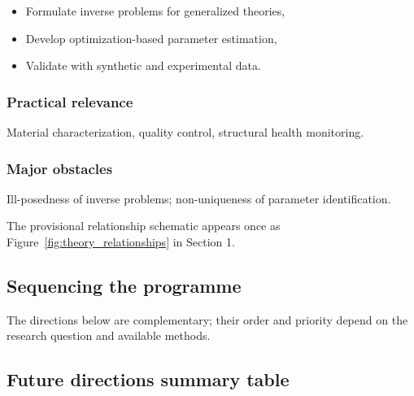 \begin{itemize}
\item Formulate inverse problems for generalized theories,
\item Develop optimization-based parameter estimation,
\item Validate with synthetic and experimental data.
\end{itemize}

\subsubsection{Practical relevance}

Material characterization, quality control, structural health monitoring.

\subsubsection{Major obstacles}

Ill-posedness of inverse problems; non-uniqueness of parameter identification.

The provisional relationship schematic appears once as Figure~\ref{fig:theory_relationships} in Section 1.

\subsection{Sequencing the programme}
\label{sec:programme-sequencing}

The directions below are complementary; their order and priority depend on the research question and available methods.

\subsection{Future directions summary table}
\label{sec:future-summary}

